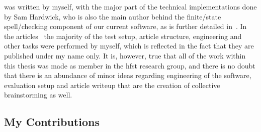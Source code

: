 \documentclass[officiallayout,final]{unihelcompling}
\begin{document}
was written by myself, with the major part of the technical implementations
done by Sam Hardwick, who is also the main author behind the finite\-/state
spell\-/checking component of our current software, as is further detailed
in~\citet{linden2011hfst}.  In the
articles~ the majority
of the test setup, article structure, engineering and other tasks were
performed by myself, which is reflected in the fact that they are published
under my name only. It is, however, true that all of the work within this
thesis was made as member in the \gls{hfst} research group, and there is no
doubt that there is an abundance of minor ideas regarding engineering of the
software, evaluation setup and article writeup that are the creation of
collective brainstorming as well.

\subsection{My Contributions}
\label{subsec:contributions}
\end{document}
